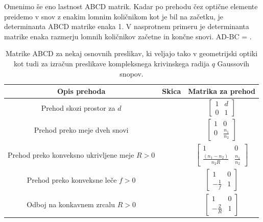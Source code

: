 Omenimo še eno lastnost ABCD matrik. Kadar po prehodu čez optične elemente preidemo v snov 
z enakim lomnim količnikom kot je bil na začetku, je determinanta ABCD matrike enaka 1. V nasprotnem
primeru je determinanta matrike enaka razmerju lomnih količnikov začetne in končne snovi. 
\beq
AD-BC = .
\eeq
\newpage
\begin{table}[t!]
 \centering
  \begin{tabular}{|c|c|c|} \hline
  Opis prehoda & Skica & Matrika za prehod \\ \hline   
      Prehod skozi prostor za $d$ & \parbox[c]{3cm}{\def\svgwidth{3cm}} & 
      $\begin{bmatrix} 1 & d\\  0 & 1 \end{bmatrix}$ \\ \hline

      Prehod preko meje dveh snovi & \parbox[c]{3cm}{\def\svgwidth{3cm}} & 
      $\begin{bmatrix} 1 & 0\\ 0 & \frac{n_{1}}{n_{2}} \end{bmatrix}$ \\ \hline
      
      Prehod preko konveksno ukrivljene meje $R>0$ & \parbox[c]{3cm}{\def\svgwidth{3cm}} & 
      $\begin{bmatrix} 1 & 0\\ \frac{(n_{1}-n_{2})}{n_{2}R} & \frac{n_{1}}{n_{2}} \end{bmatrix}$ \\ \hline
      
      Prehod preko konveksne leče $f>0$ & \parbox[c]{3cm}{\def\svgwidth{3cm}} & 
      $\begin{bmatrix} 1 & 0\\ -\frac{1}{f} & 1 \end{bmatrix}$ \\ \hline
      
      Odboj na konkavnem zrcalu $R>0$ & \parbox[c]{3cm}{\def\svgwidth{3cm}} & 
      $\begin{bmatrix} 1 & 0\\ -\frac{2}{R} & 1 \end{bmatrix}$ \\ \hline    
  \end{tabular}
  \caption{Matrike ABCD za nekaj osnovnih preslikav, ki veljajo tako v 
	  geometrijski optiki kot tudi za izračun preslikave kompleksnega
	  krivinskega radija $q$ Gaussovih snopov.}
\label{fig:Matrike-za-preslikave}
\end{table}

